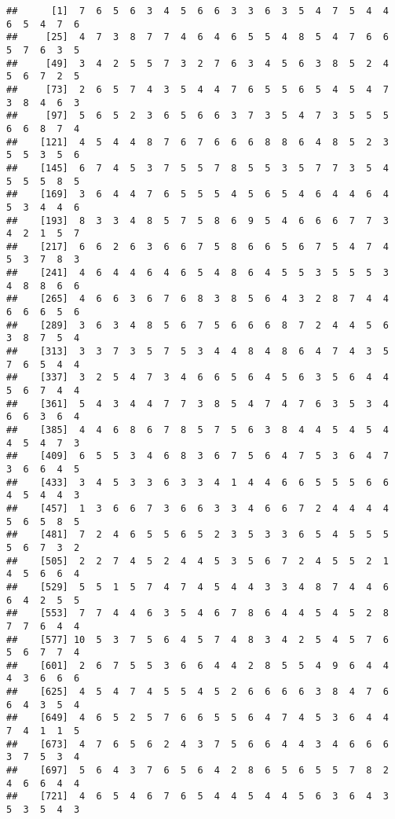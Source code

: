 \documentclass[
]{book}
\begin{document}
\begin{verbatim}
##      [1]  7  6  5  6  3  4  5  6  6  3  3  6  3  5  4  7  5  4  4  6  5  4  7  6
##     [25]  4  7  3  8  7  7  4  6  4  6  5  5  4  8  5  4  7  6  6  5  7  6  3  5
##     [49]  3  4  2  5  5  7  3  2  7  6  3  4  5  6  3  8  5  2  4  5  6  7  2  5
##     [73]  2  6  5  7  4  3  5  4  4  7  6  5  5  6  5  4  5  4  7  3  8  4  6  3
##     [97]  5  6  5  2  3  6  5  6  6  3  7  3  5  4  7  3  5  5  5  6  6  8  7  4
##    [121]  4  5  4  4  8  7  6  7  6  6  6  8  8  6  4  8  5  2  3  5  5  3  5  6
##    [145]  6  7  4  5  3  7  5  5  7  8  5  5  3  5  7  7  3  5  4  5  5  5  8  5
##    [169]  3  6  4  4  7  6  5  5  5  4  5  6  5  4  6  4  4  6  4  5  3  4  4  6
##    [193]  8  3  3  4  8  5  7  5  8  6  9  5  4  6  6  6  7  7  3  4  2  1  5  7
##    [217]  6  6  2  6  3  6  6  7  5  8  6  6  5  6  7  5  4  7  4  5  3  7  8  3
##    [241]  4  6  4  4  6  4  6  5  4  8  6  4  5  5  3  5  5  5  3  4  8  8  6  6
##    [265]  4  6  6  3  6  7  6  8  3  8  5  6  4  3  2  8  7  4  4  6  6  6  5  6
##    [289]  3  6  3  4  8  5  6  7  5  6  6  6  8  7  2  4  4  5  6  3  8  7  5  4
##    [313]  3  3  7  3  5  7  5  3  4  4  8  4  8  6  4  7  4  3  5  7  6  5  4  4
##    [337]  3  2  5  4  7  3  4  6  6  5  6  4  5  6  3  5  6  4  4  5  6  7  4  4
##    [361]  5  4  3  4  4  7  7  3  8  5  4  7  4  7  6  3  5  3  4  6  6  3  6  4
##    [385]  4  4  6  8  6  7  8  5  7  5  6  3  8  4  4  5  4  5  4  4  5  4  7  3
##    [409]  6  5  5  3  4  6  8  3  6  7  5  6  4  7  5  3  6  4  7  3  6  6  4  5
##    [433]  3  4  5  3  3  6  3  3  4  1  4  4  6  6  5  5  5  6  6  4  5  4  4  3
##    [457]  1  3  6  6  7  3  6  6  3  3  4  6  6  7  2  4  4  4  4  5  6  5  8  5
##    [481]  7  2  4  6  5  5  6  5  2  3  5  3  3  6  5  4  5  5  5  5  6  7  3  2
##    [505]  2  2  7  4  5  2  4  4  5  3  5  6  7  2  4  5  5  2  1  4  5  6  6  4
##    [529]  5  5  1  5  7  4  7  4  5  4  4  3  3  4  8  7  4  4  6  6  4  2  5  5
##    [553]  7  7  4  4  6  3  5  4  6  7  8  6  4  4  5  4  5  2  8  7  7  6  4  4
##    [577] 10  5  3  7  5  6  4  5  7  4  8  3  4  2  5  4  5  7  6  5  6  7  7  4
##    [601]  2  6  7  5  5  3  6  6  4  4  2  8  5  5  4  9  6  4  4  4  3  6  6  6
##    [625]  4  5  4  7  4  5  5  4  5  2  6  6  6  6  3  8  4  7  6  6  4  3  5  4
##    [649]  4  6  5  2  5  7  6  6  5  5  6  4  7  4  5  3  6  4  4  7  4  1  1  5
##    [673]  4  7  6  5  6  2  4  3  7  5  6  6  4  4  3  4  6  6  6  3  7  5  3  4
##    [697]  5  6  4  3  7  6  5  6  4  2  8  6  5  6  5  5  7  8  2  4  6  6  4  4
##    [721]  4  6  5  4  6  7  6  5  4  4  5  4  4  5  6  3  6  4  3  5  3  5  4  3

\end{verbatim}
\end{document}
